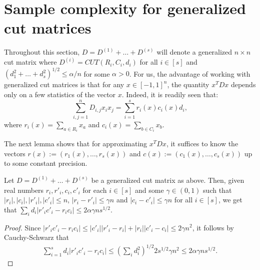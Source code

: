 \documentclass[final, 12pt]{colt2018}
\theoremstyle{definition}
\theoremstyle{plain}
\begin{document}
\section{Sample complexity for generalized cut matrices}
\label{section-sample-complexity-generalized-cut}
Throughout this section, $D = D^{(1)} + \dots + D^{(s)}$ will denote a generalized $n\times n$ cut matrix where $D^{(i)}=CUT(R_i, C_i, d_i)$ for all $i\in [s]$ and $(d_{1}^{2}+\dots+d_{s}^{2})^{1/2} \leq \alpha/n$ for some $\alpha > 0$. For us, the advantage of working with generalized cut matrices is that for any $x\in [-1,1]^{n}$, the quantity $x^{T}Dx$ depends only on a few statistics of the vector $x$. Indeed, it is readily seen that:
\begin{equation}
\label{eqn:quadratic-simplified-generalized-cut}
\sum_{i,j=1}^{n} D_{i,j}x_ix_j = \sum_{i=1}^{s}r_{i}(x)c_{i}(x)d_{i}, 
\end{equation}
where $r_{i}(x)=\sum_{a\in R_{i}}x_{a}$ and $c_{i}(x)=\sum_{b\in C_{i}}x_{b}$. 

The next lemma shows that for approximating $x^{T}Dx$, it suffices to know the vectors $r(x):=(r_1(x),\dots,r_s(x))$ and $c(x):=(c_1(x),\dots,c_s(x))$ up to some constant precision. 
\begin{lemma}\label{lemma:gamma-def}
Let $D = D^{(1)}+\dots + D^{(s)}$ be a generalized cut matrix as above. Then, given real numbers $r_{i},r'_{i},c_{i},c'_{i}$ for each $i\in[s]$ and some 
$\gamma \in (0,1)$ such that $|r_i|,|c_i|,|r'_i|,|c'_i| \le n$, 
$|r_i - r'_i| \le \gamma n$ and $|c_i - c'_i| \le \gamma n$ 
for all $i\in[s]$, we get that 
$\sum_i d_i|r'_i c'_i - r_i c_i| \le 2\alpha\gamma ns^{1/2}$. 
\end{lemma}
\begin{proof}
Since $ |r'_i c'_i - r_i c_i| \le |c'_i||r'_i - r_i| + |r_i||c'_i - c_i| \le 2\gamma n^2$, it follows by Cauchy-Schwarz that
\begin{align*}
\sum_{i=1}^{s} d_i|r'_i c'_i - r_i c_i|
\le \left(\sum_i d_i ^{2}\right)^{1/2} 2 s^{1/2} \gamma n^{2}
\le  2\alpha\gamma ns^{1/2}.
\end{align*} 
\end{proof}
\end{document}
